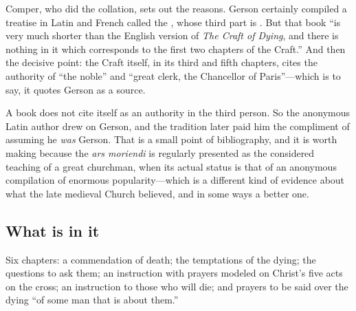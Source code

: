 Comper, who did the collation, sets out the reasons. Gerson certainly compiled a treatise in Latin and French called the , whose third part is . But that book ``is very much shorter than the English version of \emph{The Craft of Dying}, and there is nothing in it which corresponds to the first two chapters of the Craft.'' And then the decisive point: the Craft itself, in its third and fifth chapters, cites the authority of ``the noble'' and ``great clerk, the Chancellor of Paris''---which is to say, it quotes Gerson as a source.

A book does not cite itself as an authority in the third person. So the anonymous Latin author drew on Gerson, and the tradition later paid him the compliment of assuming he \emph{was} Gerson. That is a small point of bibliography, and it is worth making because the \emph{ars moriendi} is regularly presented as the considered teaching of a great churchman, when its actual status is that of an anonymous compilation of enormous popularity---which is a different kind of evidence about what the late medieval Church believed, and in some ways a better one.

\subsection{What is in it}

Six chapters: a commendation of death; the temptations of the dying; the questions to ask them; an instruction with prayers modeled on Christ's five acts on the cross; an instruction to those who will die; and prayers to be said over the dying ``of some man that is about them.''

